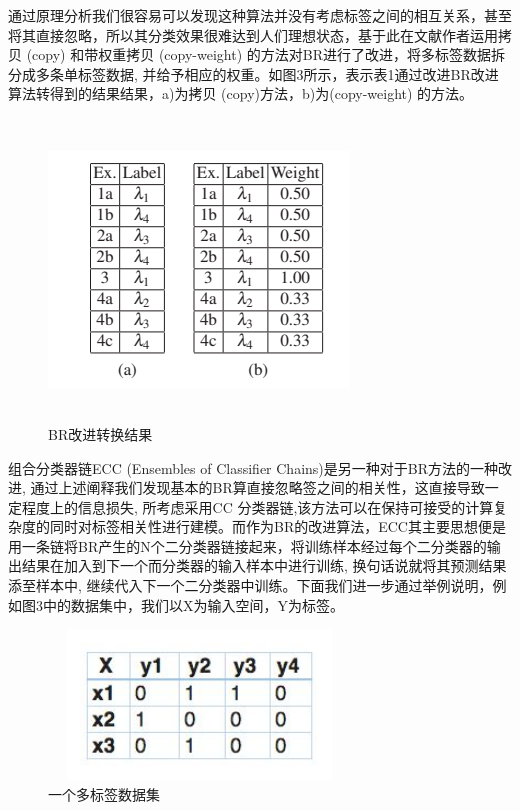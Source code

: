 通过原理分析我们很容易可以发现这种算法并没有考虑标签之间的相互关系，甚至将其直接忽略，所以其分类效果很难达到人们理想状态，基于此在文献\cite{Clare2002Knowledge}作者运用拷贝 (copy) 和带权重拷贝 (copy-weight) 的方法对BR进行了改进，将多标签数据拆分成多条单标签数据, 并给予相应的权重。如图3所示，表示表1通过改进BR改进算法转得到的结果结果，a)为拷贝 (copy)方法，b)为(copy-weight) 的方法。

\begin{figure}[htbp!]
	\centering
	\includegraphics[width=8cm, height=8cm]{figures/p2-3.png}
	\caption{BR改进转换结果}\label{fig:p2-3}
	\vspace{-1em}
\end{figure}

组合分类器链ECC (Ensembles of Classifier Chains)是另一种对于BR方法的一种改进, 通过上述阐释我们发现基本的BR算直接忽略签之间的相关性，这直接导致一定程度上的信息损失, 所考虑采用CC 分类器链,该方法可以在保持可接受的计算复杂度的同时对标签相关性进行建模。而作为BR的改进算法，ECC其主要思想便是用一条链将BR产生的N个二分类器链接起来，将训练样本经过每个二分类器的输出结果在加入到下一个而分类器的输入样本中进行训练, 换句话说就将其预测结果添至样本中, 继续代入下一个二分类器中训练。下面我们进一步通过举例说明，例如图3中的数据集中，我们以X为输入空间，Y为标签。

\begin{figure}[htbp!]
	\centering
	\includegraphics[width=8cm, height=4cm]{figures/p2-4.png}
	\caption{一个多标签数据集}\label{fig:p2-4}
	\vspace{-1em}
\end{figure}

